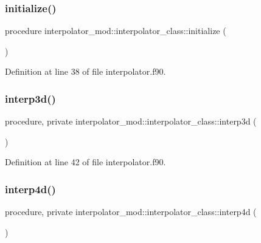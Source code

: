 \subsubsection{\texorpdfstring{initialize()}{initialize()}}
{\footnotesize\ttfamily procedure interpolator\+\_\+mod\+::interpolator\+\_\+class\+::initialize (\begin{DoxyParamCaption}{ }\end{DoxyParamCaption})\hspace{0.3cm}{\ttfamily [private]}}



Definition at line 38 of file interpolator.\+f90.

\mbox{\label{structinterpolator__mod_1_1interpolator__class_a64a829fe34f0cf8a22f5b56718d7c51c}} 
\subsubsection{\texorpdfstring{interp3d()}{interp3d()}}
{\footnotesize\ttfamily procedure, private interpolator\+\_\+mod\+::interpolator\+\_\+class\+::interp3d (\begin{DoxyParamCaption}{ }\end{DoxyParamCaption})\hspace{0.3cm}{\ttfamily [private]}}



Definition at line 42 of file interpolator.\+f90.

\mbox{\label{structinterpolator__mod_1_1interpolator__class_a150485e59a4b0edc41e730c116a37073}} 
\subsubsection{\texorpdfstring{interp4d()}{interp4d()}}
{\footnotesize\ttfamily procedure, private interpolator\+\_\+mod\+::interpolator\+\_\+class\+::interp4d (\begin{DoxyParamCaption}{ }\end{DoxyParamCaption})\hspace{0.3cm}{\ttfamily [private]}}




